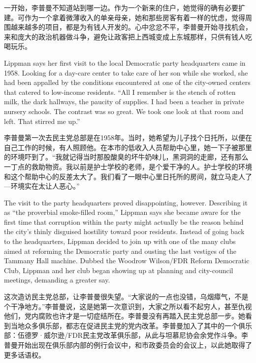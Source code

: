 \ifdefined\chs
一开始，李普曼不知道站到哪一边。作为一个新来的住户，她觉得的确有必要扩建。可作为一个拿着微薄收入的单亲母亲，她和那些房客有着一样的忧虑，觉得周围越来越多的项目，都是为有钱人开发的。心中忿忿不平，李普曼开始寻找机会，来和庞大的政治机器做斗争，避免让政客把上西城变成上东城那样，只供有钱人吃喝玩乐。
\fi

\ifdefined\eng
Lippman says her first visit to the local Democratic party headquarters came in 1958. Looking for a day-care center to take care of her son while she worked, she had been appalled by the conditions encountered at one of the city-owned centers that catered to low-income residents. ``All I remember is the stench of rotten milk, the dark hallways, the paucity of supplies. I had been a teacher in private nursery schools. The contrast was so great. We took one look at that room and left. That stirred me up.''
\fi

\ifdefined\chs
李普曼第一次去民主党总部是在1958年。当时，她希望为儿子找个日托所，以便在自己工作的时候，有人照顾他。在本市的低收入人员帮助中心里，她一下子被那里的环境吓到了。``我就记得当时那股酸臭的坏牛奶味儿，黑洞洞的走廊，还有那么一丁点的救助物资。我以前是护士学校的老师，是个爱干净的人。护士学校的环境和这个帮助中心的反差太大了。我们看了一眼中心里日托所的房间，就立马走人了---环境实在太让人恶心。''
\fi

\ifdefined\eng
The visit to the party headquarters proved disappointing, however. Describing it as ``the proverbial smoke-filled room,'' Lippman says she became aware for the first time that corruption within the party might actually be the reason behind the city's thinly disguised hostility toward poor residents. Instead of going back to the headquarters, Lippman decided to join up with one of the many clubs aimed at reforming the Democratic party and ousting the last vestiges of the Tammany Hall machine. Dubbed the Woodrow Wilson/FDR Reform Democratic Club, Lippman and her club began showing up at planning and city-council meetings, demanding a greater say.
\fi

\ifdefined\chs
这次造访民主党总部，让李普曼很失望。``大家说的一点也没错，乌烟瘴气，不是个干净地方。''李普曼说，这是她第一次意识到，大家之所以看不起穷人，甚至仇视他们，党内腐败也许才是一切症结所在。李普曼没有再踏入民主党总部一步。她看到当地众多俱乐部，都志在促进民主党的党内改革。李普曼加入了其中的一个俱乐部：伍德罗·威尔逊/FDR民主党改革俱乐部，从此与坦慕尼协会余党作斗争。李普曼开始出现在俱乐部内部的例行会议中，和市政委员会的会议上，以此她取得了更多话语权。
\fi

